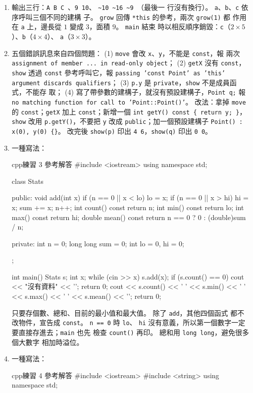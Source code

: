 \begin{enumerate}
\item 輸出三行：\texttt{A B C }、\texttt{9 10}、
\texttt{\textasciitilde 10 \textasciitilde 16 \textasciitilde 9 }（最後一
行沒有換行）。 \texttt{a}、\texttt{b}、\texttt{c} 依序呼叫三個不同的建構
子。 \texttt{grow} 回傳 \texttt{*this} 的參考，兩次 \texttt{grow(1)} 都
作用在 \texttt{a} 上，邊長從 $1$ 變成 $3$，面積 $9$。 \texttt{main} 結束
時以相反順序銷毀：\texttt{c}（$2 \times 5$）、\texttt{b}（$4 \times 4$）、
\texttt{a}（$3 \times 3$）。
\item 五個錯誤訊息來自四個問題：
(1) \texttt{move} 會改 \texttt{x}、\texttt{y}，不能是 \texttt{const}，報
兩次 \texttt{assignment of member ... in read-only object}；
(2) \texttt{getX} 沒有 \texttt{const}，\texttt{show} 透過 \texttt{const}
參考呼叫它，報 \texttt{passing 'const Point' as 'this' argument discards
qualifiers}；
(3) \texttt{p.y} 是 \texttt{private}，\texttt{show} 不是成員函式，不能存
取；
(4) 寫了帶參數的建構子，就沒有預設建構子，\texttt{Point q;} 報
\texttt{no matching function for call to 'Point::Point()'}。
改法：拿掉 \texttt{move} 的 \texttt{const}；\texttt{getX} 加上
\texttt{const}；新增一個 \texttt{int getY() const \{ return y; \}}，
\texttt{show} 改用 \texttt{p.getY()}，不要把 \texttt{y} 改成
\texttt{public}；加一個預設建構子 \texttt{Point() : x(0), y(0) \{\}}。
改完後 \texttt{show(p)} 印出 \texttt{4 6}，\texttt{show(q)} 印出
\texttt{0 0}。
\item 一種寫法：
\begin{code}{cpp}{練習 3 參考解答}
#include <iostream>
using namespace std;

class Stats {
public:
    void add(int x) {
        if (n == 0 || x < lo) {
            lo = x;
        }
        if (n == 0 || x > hi) {
            hi = x;
        }
        sum += x;
        n++;
    }
    int count() const { return n; }
    int min() const { return lo; }
    int max() const { return hi; }
    double mean() const { return n == 0 ? 0 : (double)sum / n; }

private:
    int n = 0;
    long long sum = 0;
    int lo = 0, hi = 0;
};

int main() {
    Stats s;
    int x;
    while (cin >> x) {
        s.add(x);
    }
    if (s.count() == 0) {
        cout << "沒有資料" << '\n';
        return 0;
    }
    cout << s.count() << ' ' << s.min() << ' ' << s.max() << ' ' << s.mean() << '\n';
    return 0;
}
\end{code}
只要存個數、總和、目前的最小值和最大值。 除了 \texttt{add}，其他四個函式
都不改物件，宣告成 \texttt{const}。 \texttt{n == 0} 時 \texttt{lo}、
\texttt{hi} 沒有意義，所以第一個數字一定要直接存進去；\texttt{main} 也先
檢查 \texttt{count()} 再印。 總和用 \texttt{long long}，避免很多個大數字
相加時溢位。
\item 一種寫法：
\begin{code}{cpp}{練習 4 參考解答}
#include <iostream>
#include <string>
using namespace std;


\end{code}
\end{enumerate}
